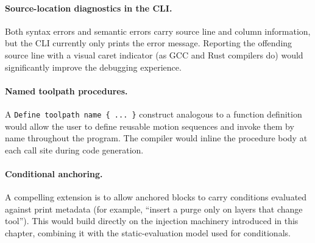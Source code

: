 \paragraph{Source-location diagnostics in the CLI.}
Both syntax errors and semantic errors carry source line and column information, but the CLI currently only prints the error message. Reporting the offending source line with a visual caret indicator (as GCC and Rust compilers do) would significantly improve the debugging experience.

\paragraph{Named toolpath procedures.}
A \texttt{Define toolpath name \{ ... \}} construct analogous to a function definition would allow the user to define reusable motion sequences and invoke them by name throughout the program. The compiler would inline the procedure body at each call site during code generation.

\paragraph{Conditional anchoring.}
A compelling extension is to allow anchored blocks to carry conditions evaluated against print metadata (for example, ``insert a purge only on layers that change tool''). This would build directly on the injection machinery introduced in this chapter, combining it with the static-evaluation model used for conditionals.
